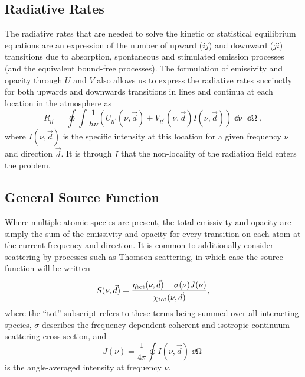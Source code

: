 \subsection{Radiative Rates}

The radiative rates that are needed to solve the kinetic or statistical equilibrium equations are an expression of the number of upward ($ij$) and downward ($ji$) transitions due to absorption, spontaneous and stimulated emission processes (and the equivalent bound-free processes).
The formulation of emissivity and opacity through $U$ and $V$ also allows us to express the radiative rates succinctly for both upwards and downwards transitions in lines and continua at each location in the atmosphere as
\begin{equation}
    \label{Eq:RadiativeRates}
    R_{ll^\prime} = \oint \int \frac{1}{h\nu} \left( U_{ll^\prime}(\nu, \vec{d}) + V_{ll^\prime}(\nu, \vec{d})I(\nu, \vec{d}) \right) \mathop{\dd{}\nu}\mathop{\dd{}\Omega},
\end{equation}
where $I(\nu, \vec{d})$ is the specific intensity at this location for a given frequency $\nu$ and direction $\vec{d}$.
It is through $I$ that the non-locality of the radiation field enters the problem.

\subsection{General Source Function}

Where multiple atomic species are present, the total emissivity and opacity are simply the sum of the emissivity and opacity for every transition on each atom at the current frequency and direction. It is common to additionally consider scattering by processes such as Thomson scattering, in which case the source function will be written
\begin{equation}
    S(\nu, \vec{d}) = \frac{\eta_\textnormal{tot}(\nu, \vec{d}) + \sigma(\nu)J(\nu)}{\chi_\textnormal{tot}(\nu, \vec{d})},
\end{equation}
where the ``tot'' subscript refers to these terms being summed over all interacting species, $\sigma$ describes the frequency-dependent coherent and isotropic continuum scattering cross-section, and
\begin{equation}
    J(\nu) = \frac{1}{4\pi}\oint I(\nu, \vec{d}) \mathop{\dd{}\Omega}
\end{equation}
is the angle-averaged intensity at frequency $\nu$.


